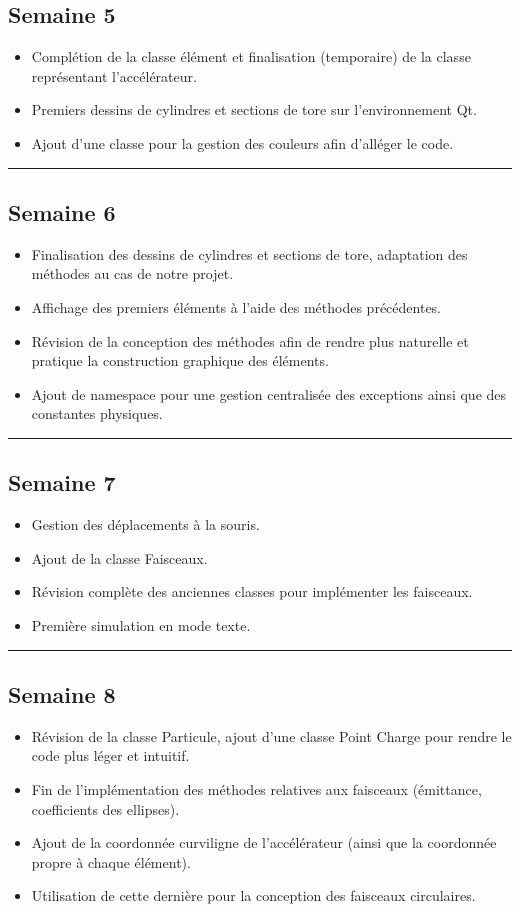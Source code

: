 \documentclass[12pt, letterpaper, twoside]{article}
\begin{document}
\subsection*{Semaine 5}
\begin{itemize}
\item Complétion de la classe élément et finalisation (temporaire) de la classe représentant l'accélérateur.
\item Premiers dessins de cylindres et sections de tore sur l’environnement Qt.
\item Ajout d’une classe pour la gestion des couleurs afin d’alléger le code.
\end{itemize}
\rule{\textwidth}{0.4pt}

\subsection*{Semaine 6}
\begin{itemize}
\item Finalisation des dessins de cylindres et sections de tore, adaptation des méthodes au cas de notre projet.
\item Affichage des premiers éléments à l'aide des méthodes précédentes.
\item Révision de la conception des méthodes afin de rendre plus naturelle et pratique la construction graphique des éléments.
\item Ajout de namespace pour une gestion centralisée des exceptions ainsi que des constantes physiques.
\end{itemize}

\rule{\textwidth}{0.4pt}

\subsection*{Semaine 7}
\begin{itemize}
\item Gestion des déplacements à la souris.
\item Ajout de la classe Faisceaux.
\item Révision complète des anciennes classes pour implémenter les faisceaux.
\item Première simulation en mode texte.
\end{itemize}

\rule{\textwidth}{0.4pt}

\subsection*{Semaine 8}
\begin{itemize}
\item Révision de la classe Particule, ajout d’une classe Point Charge pour rendre le code plus léger et intuitif.
\item Fin de l'implémentation des méthodes relatives aux faisceaux (émittance, coefficients des ellipses).
\item Ajout de la coordonnée curviligne de l’accélérateur (ainsi que la coordonnée propre à chaque élément).
\item Utilisation de cette dernière pour la conception des faisceaux circulaires.
\end{itemize}
\end{document}
